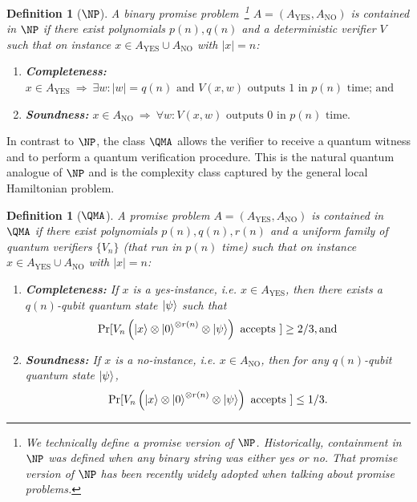 \documentclass[a4paper,onecolumn,11pt]{quantumarticle}
\theoremstyle{plain}
\newtheorem{definition}[theorem]{Definition}
\begin{document}
\begin{definition}[$\NP$]
   A binary promise problem~\footnote{We technically define a promise version of $\NP$. Historically, containment in $\NP$ was defined when any binary string was either yes or no. That promise version of $\NP$ has been recently widely adopted when talking about promise problems.} $A = \left(A_{\mathrm{YES}}, A_{\mathrm{NO}}\right)$ is contained in $\NP$ if there exist polynomials $p(n), q(n)$ and a deterministic verifier $V$ such that on instance $x \in A_{\mathrm{YES}} \cup A_{\mathrm{NO}}$ with $|x| = n$:
    \begin{enumerate}
        \item \textbf{Completeness:} $x \in A_{\mathrm{YES}} \: \Longrightarrow \: \exists w: |w| = q(n) \text{ and } V(x, w) \text{ outputs } 1 \text{ in } p(n) \text{ time; and}$
        \item \textbf{Soundness:} $ x \in A_{\mathrm{NO}} \: \Longrightarrow \: \forall w: V(x, w) \text{ outputs } 0 \text{ in } p(n) \text{ time.}$
    \end{enumerate}
\end{definition}

In contrast to $\NP$, the class $\QMA$ allows the verifier to receive a quantum witness and to perform a quantum verification procedure.  This is the natural quantum analogue of $\NP$ and is the complexity class captured by the general local Hamiltonian problem.

\begin{definition}[$\QMA$]
   A promise problem $A = \left(A_{\mathrm{YES}}, A_{\mathrm{NO}}\right)$ is contained in $\QMA$ if there exist polynomials $p(n), q(n), r(n)$ and a uniform family of quantum verifiers $\{V_n\}$ (that run in $p(n)$ time) such that on instance $x \in A_{\mathrm{YES}} \cup A_{\mathrm{NO}}$ with $|x| = n$:
    \begin{enumerate}
        \item \textbf{Completeness:} If $x$ is a yes-instance, i.e. $x \in A_{\mathrm{YES}}$, then there exists a $q(n)$-qubit quantum state $\ket{\psi}$ such that
        \begin{equation}
            \Pr[V_n\left(\ket{x} \otimes \ket{0}^{\otimes r(n)} \otimes \ket{\psi}\right) \text{ accepts } ] \geq 2/3, \text{and}
        \end{equation}
        \item \textbf{Soundness:} If $x$ is a no-instance, i.e. $x \in A_{\mathrm{NO}}$, then for any $q(n)$-qubit quantum state $\ket{\psi}$, 
        \begin{equation}
            \Pr[V_n\left(\ket{x} \otimes \ket{0}^{\otimes r(n)} \otimes \ket{\psi}\right) \text{ accepts }] \leq 1/3.
        \end{equation}
    \end{enumerate}
\end{definition}
\end{document}
